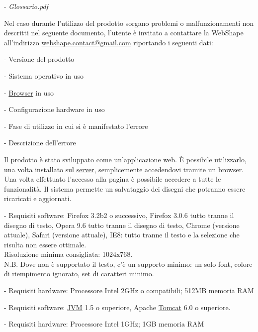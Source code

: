 \begin{elencopuntato}[\normindent]
	\item[-] \textit{Glossario.pdf}
\end{elencopuntato}

Nel caso durante l'utilizzo del prodotto sorgano problemi o malfunzionamenti non descritti nel seguente documento, l'utente \`e invitato a contattare la WebShape all'indirizzo \href{mailto:webshape.contact@gmail.com}{webshape.contact@gmail.com} riportando i seguenti dati:\\
\begin{elencopuntato}[\normindent]
	\item[-] Versione del prodotto
	\item[-] Sistema operativo in uso
	\item[-] \underline{Browser} in uso
	\item[-] Configurazione hardware in uso
	\item[-] Fase di utilizzo in cui si \`e manifestato l'errore
	\item[-] Descrizione dell'errore
\end{elencopuntato}


Il prodotto \`e stato sviluppato come un'applicazione web. \`E possibile utilizzarlo, una volta installato sul \underline{server}, semplicemente accedendovi tramite un browser. Una volta effettuato l'accesso alla pagina \`e possibile accedere a tutte le
funzionalit\`a. Il sistema permette un salvataggio dei disegni che potranno essere ricaricati e aggiornati.

\begin{elencopuntato}[\normindent]
    \item[-] Requisiti software: Firefox 3.2b2 o successivo, Firefox 3.0.6 tutto tranne il disegno di testo, Opera 9.6 tutto tranne il disegno di testo, Chrome (versione attuale), Safari (versione attuale), IE8: tutto tranne il testo e la selezione che risulta non essere ottimale.\\
    Risoluzione minima consigliata: 1024x768.\\
N.B. Dove non \`e supportato il testo, c'\`e un supporto minimo: un solo font, colore di riempimento ignorato, set di caratteri minimo. 
    \item[-] Requisiti hardware:  Processore Intel 2GHz o compatibili; 512MB memoria RAM 
\end{elencopuntato}
\begin{elencopuntato}[\normindent]
    \item[-] Requisiti software:  \underline{JVM} 1.5 o superiore, Apache \underline{Tomcat} 6.0 o superiore.
    \item[-] Requisiti hardware:  Processore Intel 1GHz; 1GB memoria RAM
\end{elencopuntato}

